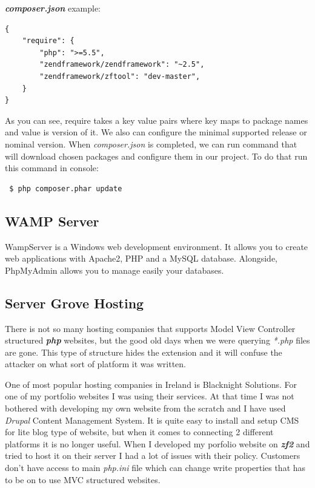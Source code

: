 \textbf{\textit{composer.json}} example:

\begin{verbatim}
{
    "require": {
        "php": ">=5.5",
        "zendframework/zendframework": "~2.5",
        "zendframework/zftool": "dev-master",
    }
}
\end{verbatim}

As you can see, require takes a key value pairs where key maps to package names and value is version of it. We also can configure the minimal supported release or nominal version. When \textit{composer.json} is completed, we can run command that will download chosen packages and configure them in our project. To do that run this command in console:
\begin{verbatim}
 $ php composer.phar update
\end{verbatim}

    \subsection{WAMP Server}
	WampServer is a Windows web development environment. It allows you to create web applications with Apache2, PHP and a MySQL database. Alongside, PhpMyAdmin allows you to manage easily your databases\cite{WAMPserver}. 
	
	
    \subsection{Server Grove Hosting}
There is not so many hosting companies that supports Model View Controller structured \textbf{\textit{php}} websites, but the good old days when we were querying \textit{*.php} files are gone. This type of structure hides the extension and it will confuse the attacker on what sort of platform it was written.

One of most popular hosting companies in Ireland is Blacknight Solutions. For one of my portfolio websites I was using their services. At that time I was not bothered with developing my own website from the scratch and I have used \textit{Drupal} Content Management System. It is quite easy to install and setup CMS for lite blog type of website, but when it comes to connecting 2 different platforms it is no longer useful. When I developed my porfolio website on \textbf{\textit{zf2}} and tried to host it on their server I had a lot of issues with their policy. Customers don't have access to main \textit{php.ini} file which can change write properties that has to be on to use MVC structured websites. 

